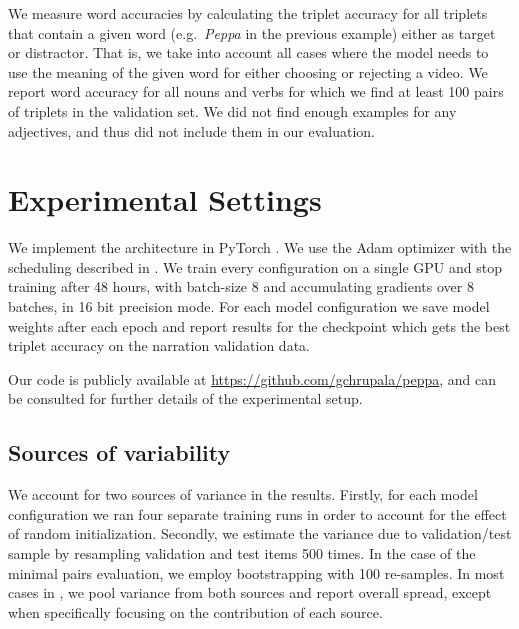 We measure word accuracies by calculating the triplet accuracy 
for all triplets that contain a given word (e.g.\ 
\textit{Peppa} in the previous example) either as target or distractor. 
That is, we take into account all cases where the model needs to use 
the meaning of the given word for either choosing or rejecting a video. 
We report word accuracy for all nouns and verbs for which we find at least 
100 pairs of triplets in the validation set. We did not find enough examples for any 
adjectives, and thus did not include them in our evaluation.



\section{Experimental Settings}
We implement the architecture in PyTorch \citep{NEURIPS2019_9015}. We
use the Adam optimizer \citep{kingma2014adam} with the scheduling
described in \citep{devlin-etal-2019-bert}. We train every
configuration on a single GPU and stop training after 48 hours, with
batch-size 8 and accumulating gradients over 8 batches, in 16 bit
precision mode. For each model configuration we save model weights
after each epoch and report results for the checkpoint which gets the
best triplet accuracy on the narration validation data. 

Our code is publicly available at \url{https://github.com/gchrupala/peppa},
and can be consulted for further details of the experimental setup.



\subsection{Sources of variability}
\label{sec:variability}
We account for two sources of variance in the results. Firstly, for
each model configuration we ran four separate training runs in order
to account for the effect of random initialization. Secondly, we
estimate the variance due to validation/test sample by 
resampling validation and test items 500 times. In the case of the minimal 
pairs evaluation, we employ bootstrapping with 100 re-samples. In most
cases in \Cref{sec:results}, we pool variance from both sources and report
overall spread, except when specifically focusing on the contribution
of each source.
